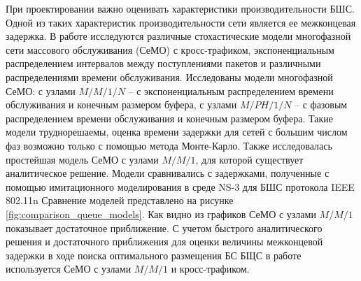 



При проектировании важно оценивать характеристики производительности БШС.
Одной из таких характеристик производительности сети является ее межконцевая задержка. В работе исследуются различные стохастические модели многофазной сети массового обслуживания (СеМО) с кросс-трафиком, экспоненциальным распределением интервалов между поступлениями пакетов и различными распределениями времени обслуживания. Исследованы модели многофазной СеМО: с узлами $M/M/1/N$ -- с экспоненциальным распределением времени обслуживания и конечным размером буфера, с узлами $M/PH/1/N$ -- с фазовым распределением времени обслуживания и конечным размером буфера. Такие модели труднорешаемы, оценка времени задержки для сетей с большим числом фаз возможно только с помощью метода Монте-Карло. Также исследовалась простейшая модель СеМО с узлами $M/M/1$, для которой существует аналитическое решение. Модели сравнивались с задержками, полученные с помощью имитационного моделирования в среде NS-3 для БШС протокола IEEE 802.11n Сравнение моделей представлено на рисунке \cref{fig:comparison_queue_models}. Как видно из графиков СеМО с узлами $M/M/1$ показывает достаточное приближение. С учетом быстрого аналитического решения и достаточного приближения для оценки величины межконцевой задержки в ходе поиска оптимального размещения БС БЩС в работе используется СеМО с узлами $M/M/1$ и кросс-трафиком.





